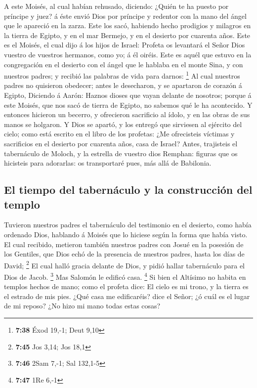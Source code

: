 A este Moisés, al cual habían rehusado, diciendo: ¿Quién
te ha puesto por príncipe y juez? á éste envió Dios por príncipe y
redentor con la mano del ángel que le apareció en la zarza.
 Este los sacó, habiendo hecho prodigios y milagros en la
tierra de Egipto, y en el mar Bermejo, y en el desierto por cuarenta
años.  Este es el Moisés, el cual dijo á los hijos de
Israel: Profeta os levantará el Señor Dios vuestro de vuestros hermanos,
como yo; á él oiréis.  Este es aquél que estuvo en la
congregación en el desierto con el ángel que le hablaba en el monte
Sina, y con nuestros padres; y recibió las palabras de vida para darnos:
\footnote{\textbf{7:38} Éxod 19,-1; Deut 9,10}  Al cual
nuestros padres no quisieron obedecer; antes le desecharon, y se
apartaron de corazón á Egipto,  Diciendo á Aarón: Haznos
dioses que vayan delante de nosotros; porque á este Moisés, que nos sacó
de tierra de Egipto, no sabemos qué le ha acontecido.  Y
entonces hicieron un becerro, y ofrecieron sacrificio al ídolo, y en las
obras de sus manos se holgaron.  Y Dios se apartó, y los
entregó que sirviesen al ejército del cielo; como está escrito en el
libro de los profetas: ¿Me ofrecisteis víctimas y sacrificios en el
desierto por cuarenta años, casa de Israel?  Antes,
trajisteis el tabernáculo de Moloch, y la estrella de vuestro dios
Remphan: figuras que os hicisteis para adorarlas: os transportaré pues,
más allá de Babilonia.

\hypertarget{el-tiempo-del-tabernuxe1culo-y-la-construcciuxf3n-del-templo}{%
\subsection{El tiempo del tabernáculo y la construcción del
templo}\label{el-tiempo-del-tabernuxe1culo-y-la-construcciuxf3n-del-templo}}

 Tuvieron nuestros padres el tabernáculo del testimonio
en el desierto, como había ordenado Dios, hablando á Moisés que lo
hiciese según la forma que había visto.  El cual
recibido, metieron también nuestros padres con Josué en la posesión de
los Gentiles, que Dios echó de la presencia de nuestros padres, hasta
los días de David; \footnote{\textbf{7:45} Jos 3,14; Jos 18,1}
 El cual halló gracia delante de Dios, y pidió hallar
tabernáculo para el Dios de Jacob. \footnote{\textbf{7:46} 2Sam 7,-1;
  Sal 132,1-5}  Mas Salomón le edificó casa. \footnote{\textbf{7:47}
  1Re 6,-1}  Si bien el Altísimo no habita en templos
hechos de mano; como el profeta dice:  El cielo es mi
trono, y la tierra es el estrado de mis pies. ¿Qué casa me edificaréis?
dice el Señor; ¿ó cuál es el lugar de mi reposo?  ¿No
hizo mi mano todas estas cosas?

